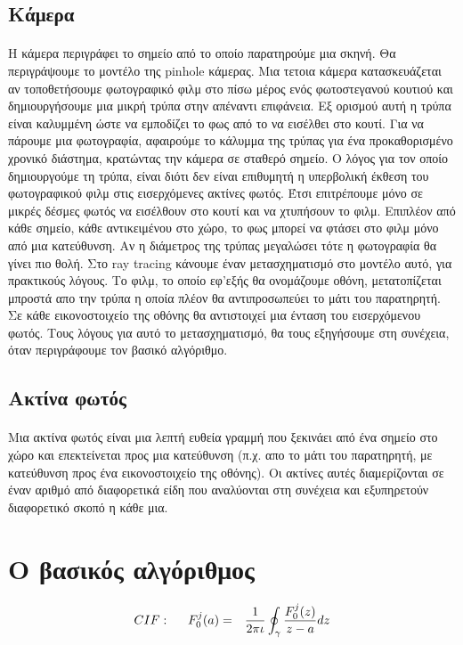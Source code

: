 \begin{sloppypar}
\subsection{Κάμερα}
\paragraph{}
	H κάμερα περιγράφει το σημείο από το οποίο παρατηρούμε μια σκηνή. Θα περιγράψουμε το μοντέλο της pinhole
κάμερας. Μια τετοια κάμερα κατασκευάζεται αν τοποθετήσουμε φωτογραφικό φιλμ στο πίσω μέρος ενός φωτοστεγανού κουτιού 
και δημιουργήσουμε μια μικρή τρύπα στην απέναντι επιφάνεια. Εξ ορισμού αυτή η τρύπα είναι καλυμμένη ώστε να 
εμποδίζει το φως από το να εισέλθει στο κουτί. Για να πάρουμε μια φωτογραφία, αφαιρούμε το κάλυμμα της τρύπας 
για ένα προκαθορισμένο χρονικό διάστημα, κρατώντας την κάμερα σε σταθερό σημείο. Ο λόγος για τον οποίο δημιουργούμε 
τη τρύπα, είναι διότι δεν είναι επιθυμητή η υπερβολική έκθεση του φωτογραφικού φιλμ στις εισερχόμενες ακτίνες φωτός. 
Έτσι επιτρέπουμε μόνο σε μικρές δέσμες φωτός να εισέλθουν στο κουτί και να χτυπήσουν το φιλμ. Επιπλέον από κάθε 
σημείο, κάθε αντικειμένου στο χώρο, το φως μπορεί να φτάσει στο φιλμ μόνο από μια κατεύθυνση. Αν η διάμετρος 
της τρύπας μεγαλώσει τότε η φωτογραφία θα γίνει πιο θολή. Στο ray tracing κάνουμε έναν μετασχηματισμό στο μοντέλο
αυτό, για πρακτικούς λόγους. Το φιλμ, το οποίο εφ'εξής θα ονομάζουμε οθόνη, μετατοπίζεται μπροστά απο την τρύπα η 
οποία πλέον θα αντιπροσωπεύει το μάτι του παρατηρητή. Σε κάθε εικονοστοιχείο της οθόνης θα αντιστοιχεί μια ένταση
του εισερχόμενου φωτός. Τους λόγους για αυτό το μετασχηματισμό, θα τους εξηγήσουμε στη συνέχεια, όταν περιγράφουμε
τον βασικό αλγόριθμο.

\subsection{Ακτίνα φωτός}
\paragraph{}
	Μια ακτίνα φωτός είναι μια λεπτή ευθεία γραμμή που ξεκινάει από ένα σημείο στο χώρο και επεκτείνεται προς 
μια κατεύθυνση (π.χ. απο το μάτι του παρατηρητή, με κατεύθυνση προς ένα εικονοστοιχείο της οθόνης). Οι ακτίνες αυτές 
διαμερίζονται σε έναν αριθμό από διαφορετικά είδη που αναλύονται στη συνέχεια και εξυπηρετούν διαφορετικό σκοπό η κάθε μια.

\section{Ο βασικός αλγόριθμος}
\paragraph{}




\begin{eqnarray}
CIF: \hspace*{5mm}F_0^j(a) &=& \frac{1}{2\pi \iota} \oint_{\gamma} \frac{F_0^j(z)}{z - a} dz
\end{eqnarray}

\end{sloppypar}


